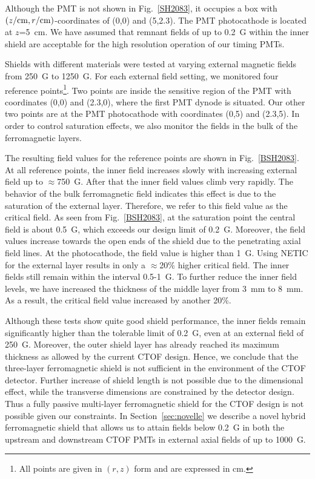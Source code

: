 \documentclass[12pt]{article}
\begin{document}
Although the PMT is not shown in Fig.~\ref{SH2083}, it occupies a box with 
$(z/{\rm cm},r/{\rm cm})$-coordinates of (0,0) and (5,2.3). The PMT photocathode 
is located at $z$=5~cm. We have assumed that remnant fields of up to 0.2~G within 
the inner shield are acceptable for the high resolution operation of our timing PMTs.

Shields with different materials were tested at varying external magnetic fields 
from 250~G to 1250~G. For each external field setting, we monitored four reference 
points\footnote{All points are given in $(r,z)$ form and are expressed in cm.}.
Two points are inside the sensitive region of the PMT with coordinates (0,0) and 
(2.3,0), where the first PMT dynode is situated. Our other two points are at the 
PMT photocathode with coordinates (0,5) and (2.3,5). In order to control saturation 
effects, we also monitor the fields in the bulk of the ferromagnetic layers.

The resulting field values for the reference points are shown in Fig.~\ref{BSH2083}.
At all reference points, the inner field increases slowly with increasing external 
field up to $\approx$750~G. After that the inner field values climb very rapidly. 
The behavior of the bulk ferromagnetic field indicates this effect is due to the 
saturation of the external layer. Therefore, we refer to this field value as the 
critical field. As seen from Fig.~\ref{BSH2083}, at the saturation point the central 
field is about 0.5~G, which exceeds our design limit of 0.2~G. Moreover, the field 
values increase towards the open ends of the shield due to the penetrating axial 
field lines. At the photocathode, the field value is higher than 1~G. Using NETIC 
for the external layer results in only a $\approx$20\% higher critical field. The 
inner fields still remain within the interval 0.5-1~G. To further reduce the inner 
field levels, we have increased the thickness of the middle layer from 3~mm to 8~mm. 
As a result, the critical field value increased by another 20\%.

Although these tests show quite good shield performance, the inner fields remain 
significantly higher than the tolerable limit of 0.2~G, even at an external field of 
250~G. Moreover, the outer shield layer has already reached its maximum thickness as 
allowed by the current CTOF design. Hence, we conclude that the three-layer 
ferromagnetic shield is not sufficient in the environment of the CTOF detector. 
Further increase of shield length is not possible due to the dimensional effect, 
while the transverse dimensions are constrained by the detector design. Thus a fully 
passive multi-layer ferromagnetic shield for the CTOF design is not possible given 
our constraints. In Section~\ref{sec:novelle} we describe a novel hybrid 
ferromagnetic shield that allows us to attain fields below 0.2~G in both the 
upstream and downstream CTOF PMTs in external axial fields of up to 1000~G.
\end{document}
